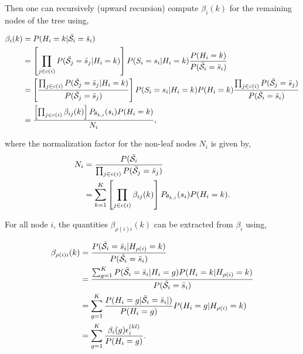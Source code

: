 \documentclass[a4paper,11pt]{report}
\begin{document}
{				Then one can recursively (upward recursion) compute $\beta_{i}(k)$ for the remaining nodes of the tree using,
				
				\begin{equation}
					\begin{split}
						\beta_{i}(k)	&= P(H_{i}=k | \bar{\mathcal{S}}_{i}= \bar{s}_{i})\\
													&= \left[ \prod_{j \in c(i)} P(\bar{\mathcal{S}}_{j}= \bar{s}_{j} | H_{i}=k) \right] P(S_{i}= s_{i} | H_{i}=k) \frac{P(H_{i}=k)} {P(\bar{\mathcal{S}}_{i}= \bar{s}_{i})}\\
													&= \left[ \frac{\prod_{j \in c(i)} P(\bar{\mathcal{S}}_{j}= \bar{s}_{j} | H_{i}=k)} {P(\bar{\mathcal{S}}_{j}= \bar{s}_{j})} \right]
														P(S_{i}= s_{i} | H_{i}=k) P(H_{i}=k) 
														\frac{\prod_{j \in c(i)} P(\bar{\mathcal{S}}_{j}= \bar{s}_{j})} {P(\bar{\mathcal{S}}_{i}= \bar{s}_{i})}\\
													&= \frac{ \left[ \prod_{j \in c(i)} \beta_{ij}(k) \right] P_{\theta_{k,i}}(s_{i})P(H_{i}=k)}{N_{i}},
						\end{split}
						\label{eq:upward beta node}
				\end{equation}
				
				where the normalization factor for the non-leaf nodes $N_{i}$ is given by,
				\begin{equation}
					\begin{split}
						N_{i}	&= \frac{P(\bar{\mathcal{S}}_{i}}{\prod_{j \in c(i)} P(\bar{\mathcal{S}}_{j}= \bar{s}_{j})}\\
									&= \sum_{k=1}^{K} \left[ \prod_{j \in c(i)} \beta_{ij}(k) \right]  P_{\theta_{k,i}}(s_{i})P(H_{i}=k).
					\end{split}
					\label{eq:upward normalization others}
				\end{equation}

				For all node $i$, the quantities $\beta_{\rho(i)i}(k)$ can be extracted from $\beta_{i}$ using,
				
				\begin{equation}
					\begin{split}
						\beta_{\rho(i)i}(k)	&= \frac{P(\bar{\mathcal{S}}_{i}= \bar{s}_{i} | H_{\rho(i)}=k)} {P(\bar{\mathcal{S}}_{i}= \bar{s}_{i}) }\\
																&= \frac{ \sum_{g=1}^{K} P(\bar{\mathcal{S}}_{i}= \bar{s}_{i} | H_{i}=g) P(H_{i}= k | H_{\rho(i)}=k)} {P(\bar{\mathcal{S}}_{i}= \bar{s}_{i}) }\\
																&= \sum_{g=1}^{K} \frac{ P(H_{i}=g | \bar{\mathcal{S}}_{i}= \bar{s}_{i} |)}{P(H_{i}=g)} P(H_{i}= g | H_{\rho(i)}=k)\\
																&= \sum_{g=1}^{K} \frac{\beta_{i}(g) \epsilon_{i}^{(kl)}}{P(H_{i}=g)}.
						\end{split}
						\label{eq:upward beta node and parents}
				\end{equation}
				
}
\end{document}

